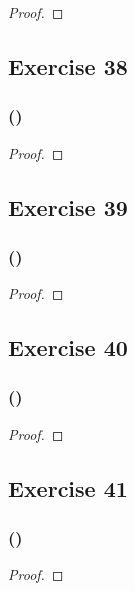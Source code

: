 \documentclass[14pt]{extarticle}
\begin{document}
\begin{proof}

\end{proof}

\subsection{Exercise 38}

\subsubsection{()}

\begin{proof}

\end{proof}

\subsection{Exercise 39}

\subsubsection{()}

\begin{proof}

\end{proof}

\subsection{Exercise 40}

\subsubsection{()}

\begin{proof}

\end{proof}

\subsection{Exercise 41}

\subsubsection{()}

\begin{proof}

\end{proof}
\end{document}
